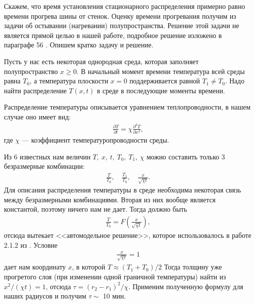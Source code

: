 \documentclass[a4paper,12pt]{report}
\begin{document}
        
        Скажем, что время установления стационарного распределения примерно равно времени прогрева шины от стенок. Оценку времени прогревания получим из задачи об остывании (нагревании) полупространства. Решение этой задачи не является прямой целью в нашей работе, подробное решение изложено в параграфе 56 \cite{sivukhin}. Опишем кратко задачу и решение.

        Пусть у нас есть некоторая однородная среда, которая заполняет полупространство $x\geq0$. В начальный момент времени температура всей среды равна $T_0$, а температура плоскости $x=0$ поддерживается равной $T_1\neq T_0$. Надо найти распределение $T(x,t)$ в среде в последующие моменты времени.

        Распределение температуры описывается уравнением теплопроводности, в нашем случае оно имеет вид:
        \begin{gather}
            \frac{\partial T}{\partial t}=\chi \frac{\partial^2 T}{\partial x^2},
        \end{gather}
        где $\chi$ --- коэффициент температуропроводности среды. 

        Из 6 известных нам величин $T,\ x,\ t,\ T_0,\ T_1,\ \chi$ можно составить только 3 безразмерные комбинации:
        \begin{gather}
            \frac{T}{T_0},\quad \frac{T_1}{T_0},\quad \frac{x}{\sqrt{\chi t}}.
        \end{gather}
        Для описания распределения температуры в среде необходима некоторая связь между безразмерными комбинациями. Вторая из них вообще является константой, поэтому ничего нам не дает. Тогда должно быть
        \begin{gather}
            \frac{T}{T_0}=F\left(\frac{x}{\sqrt{\chi t}}\right),
        \end{gather}
        отсюда вытекает <<автомодельное решение>>, которое использовалось в работе 2.1.2 из \cite{labnik}. Условие
        \begin{gather}
            \frac{x}{\sqrt{\chi t}}=1
        \end{gather}
        дает нам координату $x$, в которой $T\approx(T_1+T_0)/2$
        Тогда толщину уже прогретого слоя (при изменении одной граничной температуры) найти из $x^2/(\chi t)=1$, отсюда $\tau=(r_2-r_1)^2/\chi$. Применим полученную формулу для наших радиусов и получим $\tau \sim$ 10 мин. 
        
\end{document}
